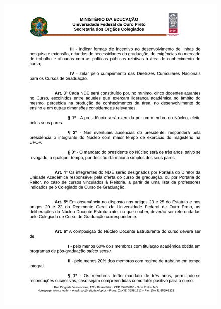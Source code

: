 \begin{figure}[p]
	\centering 
	\includegraphics[scale=0.7]{capitulos/resolucoes/cepe4450/cepe4450-p2.pdf}
\end{figure} \pagebreak

